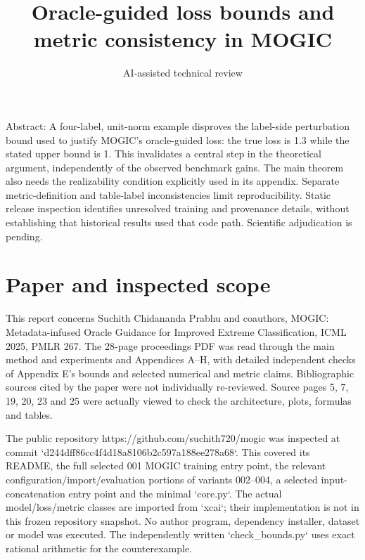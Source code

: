 \documentclass[10pt]{article}
\title{Oracle-guided loss bounds and metric consistency in MOGIC}
\author{AI-assisted technical review}
\date{}
\begin{document}
\maketitle
Abstract: A four-label, unit-norm example disproves the label-side perturbation bound used to justify MOGIC’s oracle-guided loss: the true loss is 1.3 while the stated upper bound is 1. This invalidates a central step in the theoretical argument, independently of the observed benchmark gains. The main theorem also needs the realizability condition explicitly used in its appendix. Separate metric-definition and table-label inconsistencies limit reproducibility. Static release inspection identifies unresolved training and provenance details, without establishing that historical results used that code path. Scientific adjudication is pending.\par
\section*{Paper and inspected scope}
This report concerns Suchith Chidananda Prabhu and coauthors, MOGIC: Metadata-infused Oracle Guidance for Improved Extreme Classification, ICML 2025, PMLR 267. The 28-page proceedings PDF was read through the main method and experiments and Appendices A–H, with detailed independent checks of Appendix E’s bounds and selected numerical and metric claims. Bibliographic sources cited by the paper were not individually re-reviewed. Source pages 5, 7, 19, 20, 23 and 25 were actually viewed to check the architecture, plots, formulas and tables.\par
The public repository https://github.com/suchith720/mogic was inspected at commit `d244dff86cc4f4d18a8106b2c597a188ee278a68`. This covered its README, the full selected 001 MOGIC training entry point, the relevant configuration/import/evaluation portions of variants 002–004, a selected input-concatenation entry point and the minimal `core.py`. The actual model/loss/metric classes are imported from `xcai`; their implementation is not in this frozen repository snapshot. No author program, dependency installer, dataset or model was executed. The independently written `check\_bounds.py` uses exact rational arithmetic for the counterexample.\par
\end{document}
